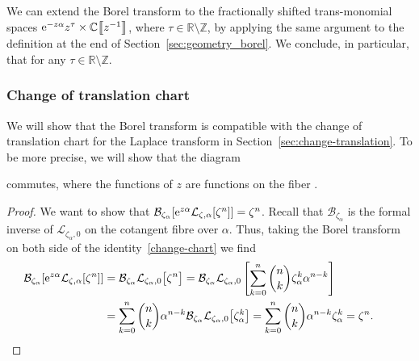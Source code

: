 \documentclass[10pt,a4paper]{amsart}
\newcommand{\Z}{\mathbb{Z}}
\newcommand{\R}{\mathbb{R}}
\newcommand{\C}{\mathbb{C}}
\newcommand{\laplace}{\mathcal{L}}
\newcommand{\borel}{\mathcal{B}}
\numberwithin{equation}{section}
\begin{document}
We can extend the Borel transform to the fractionally shifted trans-monomial spaces ${\rm e}^{-z\alpha} z^\tau\allowbreak\times \C\big\llbracket z^{-1} \big\rrbracket$, where $\tau \in \R \setminus \Z$, by applying the same argument to the definition at the end of Section~\ref{sec:geometry_borel}. We conclude, in particular, that
\smash{$\borel_{\zeta}\bigl[{\rm e}^{-z\alpha}z^{-\tau-1}\bigr] = \frac{\zeta_\alpha^\tau}{\Gamma(\tau+1)}$}
for any $\tau \in \R\setminus\Z$.

\subsubsection{Change of translation chart}\label{transl-borel}
We will show that the Borel transform is compatible with the change of translation chart for the Laplace transform in Section~\ref{sec:change-translation}. To be more precise, we will show that the diagram{\samepage
\begin{center}
\end{center}
commutes, where the functions of $z$ are functions on the fiber .}

\begin{proof}
We want to show that
$\borel_{\zeta_\alpha}[{\rm e}^{z\alpha} \laplace_{\zeta,\alpha}[\zeta^n]]=\zeta^n$.
Recall that $\borel_{\zeta_\alpha}$
is the formal inverse of $\laplace_{\zeta_\alpha,0}$ on the cotangent fibre over $\alpha$. Thus, taking the Borel transform on both side of the identity~\eqref{change-chart} we find
 \begin{align*}
 \borel_{\zeta_\alpha}[{\rm e}^{z\alpha} \laplace_{\zeta,\alpha}[\zeta^n]]&=\borel_{\zeta_\alpha}\laplace_{\zeta_\alpha,0}\bigl[\zeta^n\bigr]=\borel_{\zeta_\alpha}\laplace_{\zeta_\alpha,0}\left[\sum_{k=0}^n{n\choose k}\zeta_\alpha^k \alpha^{n-k}\right]\\
 &=\sum_{k=0}^n{n\choose k} \alpha^{n-k}\borel_{\zeta_\alpha}\laplace_{\zeta_\alpha,0}\bigl[\zeta_\alpha^k \bigr]=\sum_{k=0}^n{n\choose k} \alpha^{n-k}\zeta_\alpha^k=\zeta^n.\tag*{\qed}
 \end{align*}\renewcommand{\qed}{}
\end{proof}
\end{document}
